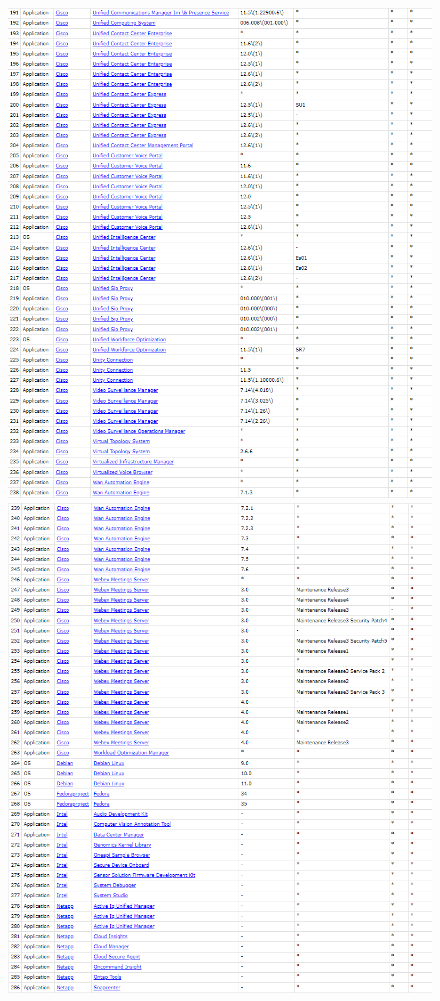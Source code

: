 \documentclass[11t]{article}
\begin{document}
\begin{figure}[H]
    \centering
    \begin{minipage}{0.49\textwidth}
        \centering
        \includegraphics[width=1\textwidth]{images/produtosAfetadosPergunta2_5.png}
    \end{minipage}
    \hfill
    \begin{minipage}{0.49\textwidth}
        \centering
        \includegraphics[width=1\textwidth]{images/produtosAfetadosPergunta2_6.png}

\end{minipage}
\end{figure}
\end{document}
